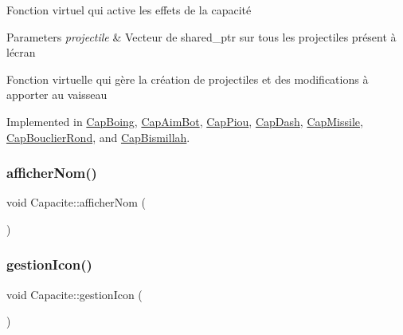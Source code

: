 Fonction virtuel qui active les effets de la capacité 


\begin{DoxyParams}{Parameters}
{\em projectile} & Vecteur de shared\+\_\+ptr sur tous les projectiles présent à l\textquotesingle{}écran\\
\hline
\end{DoxyParams}
Fonction virtuelle qui gère la création de projectiles et des modifications à apporter au vaisseau 

Implemented in \mbox{\hyperlink{class_cap_boing_a2bf6f58f93ff52263cf9926e4d91c239}{Cap\+Boing}}, \mbox{\hyperlink{class_cap_aim_bot_a68cc63c8bb28a33989db721c1ed4674d}{Cap\+Aim\+Bot}}, \mbox{\hyperlink{class_cap_piou_ae566dc069b127f27cdd770f72dbdcbe4}{Cap\+Piou}}, \mbox{\hyperlink{class_cap_dash_a09dce88d953b9b6c4b53cdcb168236ab}{Cap\+Dash}}, \mbox{\hyperlink{class_cap_missile_ae61423876aa92fc8e2555b1b856a7443}{Cap\+Missile}}, \mbox{\hyperlink{class_cap_bouclier_rond_ab664fc0b17a849d606d1a1085f2095c8}{Cap\+Bouclier\+Rond}}, and \mbox{\hyperlink{class_cap_bismillah_a3544607eb3d5e89bb6f5b6e2e2e89be0}{Cap\+Bismillah}}.

\mbox{\label{class_capacite_af2c1a095ea7e7566218a41f2469cd82a}} 
\subsubsection{\texorpdfstring{afficher\+Nom()}{afficherNom()}}
{\footnotesize\ttfamily void Capacite\+::afficher\+Nom (\begin{DoxyParamCaption}{ }\end{DoxyParamCaption})\hspace{0.3cm}{\ttfamily [inline]}}

\mbox{\label{class_capacite_af50b4c0bf1de8d846c998cba83e1e51f}} 
\subsubsection{\texorpdfstring{gestion\+Icon()}{gestionIcon()}}
{\footnotesize\ttfamily void Capacite\+::gestion\+Icon (\begin{DoxyParamCaption}{ }\end{DoxyParamCaption})}

